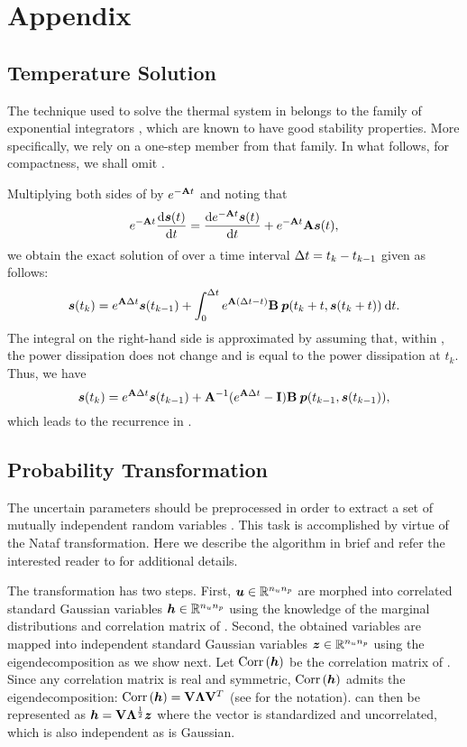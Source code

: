 \section{Appendix}

\subsection{Temperature Solution}

The technique used to solve the thermal system in  belongs
to the family of exponential integrators \cite{hochbruck2010}, which are known
to have good stability properties. More specifically, we rely on a one-step
member from that family. In what follows, for compactness, we shall omit \vu.

Multiplying both sides of  by $e^{- \mathbf{A} t}$ and
noting that
\[
  e^{-\mathbf{A} t} \frac{\mathrm{d} \boldsymbol{s}(t)}{\mathrm{d} t} = \frac{\mathrm{d} e^{-\mathbf{A} t} \boldsymbol{s}(t)}{\mathrm{d} t} + e^{-\mathbf{A} t} \mathbf{A} \boldsymbol{s}(t),
\]
we obtain the exact solution of  over a time interval
$\Delta t = t_k - t_{k - 1}$ given as follows:
\[
  \boldsymbol{s}(t_k) = e^{\mathbf{A} \Delta t} \boldsymbol{s}(t_{k - 1}) + \int_0^{\Delta t} e^{\mathbf{A} (\Delta t - t)} \mathbf{B} \: \boldsymbol{p}(t_k + t, \boldsymbol{s}(t_k + t)) \: \mathrm{d} t.
\]
The integral on the right-hand side is approximated by assuming that, within
\dt, the power dissipation does not change and is equal to the power dissipation
at $t_k$. Thus, we have
\[
  \boldsymbol{s}(t_k) = e^{\mathbf{A} \Delta t} \boldsymbol{s}(t_{k - 1}) + \mathbf{A}^{-1}(e^{\mathbf{A} \Delta t} - \mathbf{I}) \mathbf{B} \: \boldsymbol{p}(t_{k - 1}, \boldsymbol{s}(t_{k - 1})),
\]
which leads to the recurrence in .

\subsection{Probability Transformation}

The uncertain parameters \vu should be preprocessed in order to extract a set of
mutually independent random variables \vz. This task is accomplished by virtue
of the Nataf transformation. Here we describe the algorithm in brief and refer
the interested reader to \cite{li2008} for additional details.

The transformation has two steps. First, $\boldsymbol{u} \in \mathbb{R}^{{n_{u}} {n_{p}}}$ are morphed
into correlated standard Gaussian variables $\boldsymbol{h} \in \mathbb{R}^{{n_{u}} {n_{p}}}$ using the
knowledge of the marginal distributions and correlation matrix of \vu. Second,
the obtained variables are mapped into independent standard Gaussian variables
$\boldsymbol{z} \in \mathbb{R}^{{n_{u}} {n_{p}}}$ using the eigendecomposition as we show next. Let
$\correlation{\vh}$ be the correlation matrix of \vh. Since any correlation
matrix is real and symmetric, $\correlation{\vh}$ admits the eigendecomposition:
$\correlation{\vh} = \m{V} \m{\Lambda} \m{V}^T$ (see  for
the notation). \vh can then be represented as $\boldsymbol{h} = \mathbf{V}
\mathbf{\Lambda}^\frac{1}{2} \boldsymbol{z}$ where the vector \vz is standardized and
uncorrelated, which is also independent as \vz is Gaussian.

